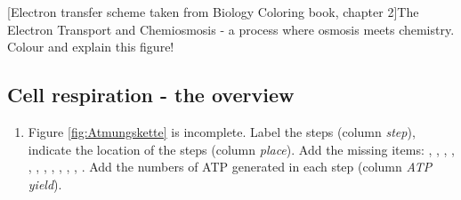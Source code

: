 {\begin{minipage}[htbp]{1\columnwidth}
	   [Electron transfer scheme taken from Biology Coloring book, chapter 2]{The Electron Transport and Chemiosmosis - a process where osmosis meets chemistry. Colour and explain this figure!}     \label{fig:ElectronTransferColourBook}
	\vspace{2pt}
	\end{minipage}
	}



\clearpage
\subsection{Cell respiration - the overview}
\begin{enumerate}[resume, leftmargin=*]
\item  Figure \ref{fig:Atmungskette} is incomplete. Label the steps (column \textit{step}), indicate the location of the steps (column \textit{place}). Add the missing items: , , , , ,  ,  ,  ,  ,  ,  , . Add the numbers of ATP generated in each step (column \textit{ATP yield}).
\end{enumerate}
\enlargethispage{2cm}

